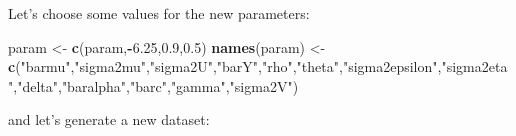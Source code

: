 \documentclass[]{book}
\newenvironment{Shaded}{\begin{snugshade}}{\end{snugshade}}
\newcommand{\FloatTok}[1]{\textcolor[rgb]{0.00,0.00,0.81}{#1}}
\newcommand{\KeywordTok}[1]{\textcolor[rgb]{0.13,0.29,0.53}{\textbf{#1}}}
\newcommand{\NormalTok}[1]{#1}
\newcommand{\OperatorTok}[1]{\textcolor[rgb]{0.81,0.36,0.00}{\textbf{#1}}}
\newcommand{\StringTok}[1]{\textcolor[rgb]{0.31,0.60,0.02}{#1}}
\theoremstyle{definition}
\theoremstyle{definition}
\theoremstyle{definition}
\theoremstyle{remark}
\begin{document}
Let's choose some values for the new parameters:

\begin{Shaded}
\begin{Highlighting}[]
\NormalTok{param <-}\StringTok{ }\KeywordTok{c}\NormalTok{(param,}\OperatorTok{-}\FloatTok{6.25}\NormalTok{,}\FloatTok{0.9}\NormalTok{,}\FloatTok{0.5}\NormalTok{)}
\KeywordTok{names}\NormalTok{(param) <-}\StringTok{ }\KeywordTok{c}\NormalTok{(}\StringTok{"barmu"}\NormalTok{,}\StringTok{"sigma2mu"}\NormalTok{,}\StringTok{"sigma2U"}\NormalTok{,}\StringTok{"barY"}\NormalTok{,}\StringTok{"rho"}\NormalTok{,}\StringTok{"theta"}\NormalTok{,}\StringTok{"sigma2epsilon"}\NormalTok{,}\StringTok{"sigma2eta"}\NormalTok{,}\StringTok{"delta"}\NormalTok{,}\StringTok{"baralpha"}\NormalTok{,}\StringTok{"barc"}\NormalTok{,}\StringTok{"gamma"}\NormalTok{,}\StringTok{"sigma2V"}\NormalTok{)}
\end{Highlighting}
\end{Shaded}

and let's generate a new dataset:
\end{document}
